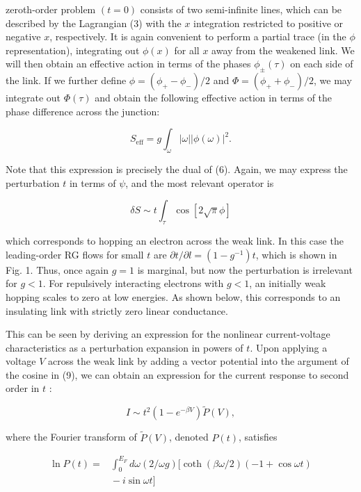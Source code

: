 \documentclass[11pt]{article}
\begin{document}
zeroth-order problem $(t=0)$ consists of two semi-infinite lines, which can be described by the Lagrangian (3) with the $x$ integration restricted to positive or negative $x$, respectively. It is again convenient to perform a partial trace (in the $\phi$ representation), integrating out $\phi(x)$ for all $x$ away from the weakened link. We will then obtain an effective action in terms of the phases $\phi_{ \pm}(\tau)$ on each side of the link. If we further define $\phi=\left(\phi_{+}-\phi_{-}\right) / 2$ and $\Phi=\left(\phi_{+}+\phi_{-}\right) / 2$, we may integrate out $\Phi(\tau)$ and obtain the following effective action in terms of the phase difference across the junction:

\begin{equation}
S_{\mathrm{eff}}=g \int_{\omega}|\omega||\phi(\omega)|^{2} . 
\end{equation}

Note that this expression is precisely the dual of (6). Again, we may express the perturbation $t$ in terms of $\psi$, and the most relevant operator is

\begin{equation}
\delta S \sim t \int_{\tau} \cos [2 \sqrt{\pi} \phi] 
\end{equation}

which corresponds to hopping an electron across the weak link. In this case the leading-order RG flows for small $t$ are $\partial t / \partial l=\left(1-g^{-1}\right) t$, which is shown in Fig. 1. Thus, once again $g=1$ is marginal, but now the perturbation is irrelevant for $g<1$. For repulsively interacting electrons with $g<1$, an initially weak hopping scales to zero at low energies. As shown below, this corresponds to an insulating link with strictly zero linear conductance.

This can be seen by deriving an expression for the nonlinear current-voltage characteristics as a perturbation expansion in powers of $t$. Upon applying a voltage $V$ across the weak link by adding a vector potential into the argument of the cosine in (9), we can obtain an expression for the current response to second order in $t$ :

\begin{equation}
I \sim t^{2}\left(1-e^{-\beta V}\right) \tilde{P}(V), 
\end{equation}

where the Fourier transform of $\tilde{P}(V)$, denoted $P(t)$, satisfies

\begin{equation}
\begin{split}
\ln P(t)={}&\int_{0}^{E_{F}} d \omega(2 / \omega g)
[\operatorname{coth}(\beta \omega / 2)(-1+\cos \omega t) \\
&{}-i \sin \omega t]
\end{split}
\end{equation}
\end{document}
